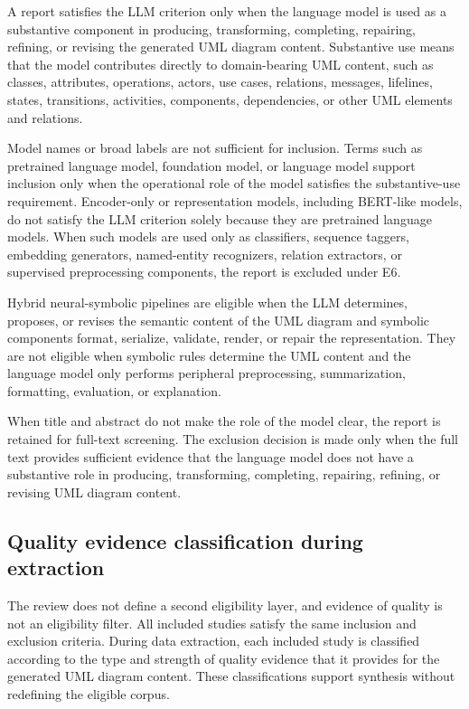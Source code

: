 A report satisfies the LLM criterion only when the language model is used as a substantive component in producing, transforming, completing, repairing, refining, or revising the generated UML diagram content. Substantive use means that the model contributes directly to domain-bearing UML content, such as classes, attributes, operations, actors, use cases, relations, messages, lifelines, states, transitions, activities, components, dependencies, or other UML elements and relations.

Model names or broad labels are not sufficient for inclusion. Terms such as pretrained language model, foundation model, or language model support inclusion only when the operational role of the model satisfies the substantive-use requirement. Encoder-only or representation models, including BERT-like models, do not satisfy the LLM criterion solely because they are pretrained language models. When such models are used only as classifiers, sequence taggers, embedding generators, named-entity recognizers, relation extractors, or supervised preprocessing components, the report is excluded under E6.

Hybrid neural-symbolic pipelines are eligible when the LLM determines, proposes, or revises the semantic content of the UML diagram and symbolic components format, serialize, validate, render, or repair the representation. They are not eligible when symbolic rules determine the UML content and the language model only performs peripheral preprocessing, summarization, formatting, evaluation, or explanation.

When title and abstract do not make the role of the model clear, the report is retained for full-text screening. The exclusion decision is made only when the full text provides sufficient evidence that the language model does not have a substantive role in producing, transforming, completing, repairing, refining, or revising UML diagram content.

\subsection{Quality evidence classification during extraction}
\label{sec:protocol_quality_axes}

The review does not define a second eligibility layer, and evidence of quality is not an eligibility filter. All included studies satisfy the same inclusion and exclusion criteria. During data extraction, each included study is classified according to the type and strength of quality evidence that it provides for the generated UML diagram content. These classifications support synthesis without redefining the eligible corpus.

